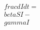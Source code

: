 \documentclass[preview]{standalone}
\begin{document}
\begin{align*}
\quad\\frac{dI}{dt} = \quad\\beta SI - \quad\\gamma I
\end{align*}
\end{document}
